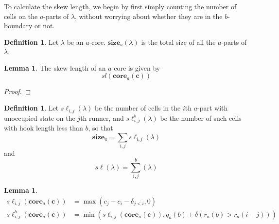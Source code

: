 \documentclass{amsart}[12pt]
\theoremstyle{definition}
\newtheorem{lemma}[dummy]{Lemma}
\newtheorem{definition}[dummy]{Definition}
\newcommand{\core}{\mathbf{core}}
\newcommand{\sk}{s\ell}
\newcommand{\aparts}{\mathbf{size}_a}
\begin{document}
\subsubsection{}
To calculate the skew length, we begin by first simply counting the number of cells on the $a$-parts of $\lambda$, without worrying about whether they are in the $b$-boundary or not.

\begin{definition} Let $\lambda$ be an $a$-core.
$\aparts(\lambda)$ is the total size of all the $a$-parts of $\lambda$.
\end{definition}


\begin{lemma}
The skew length of an $a$ core is given
 by
$$sl(\core_a(\mathbf{c}))$$

\end{lemma}

\begin{proof}


\end{proof}


\begin{definition}
Let $\sk_{i,j}(\lambda)$ be the number of cells in the $i$th $a$-part with unoccupied state on the $j$th runner, and $\sk_{i,j}^b(\lambda)$ be the number of such cells with hook length less than $b$, so that
$$\aparts=\sum_{i,j} \sk_{i,j}(\lambda)$$
and
$$\sk(\lambda)=\sum^b_{i,j}(\lambda)$$
\end{definition}

\begin{lemma}
\begin{align*}
\sk_{i,j}(\core_a(\mathbf{c}))&=\max(c_j-c_i-\delta_{j<i},0) \\
\sk^b_{i,j}(\core_a(\mathbf{c}))&=\min\left(\sk_{i,j}(\core_a(\mathbf{c})), q_a(b)+\delta(r_a(b)>r_a(i-j))\right)
\end{align*}
\end{lemma}
\end{document}
